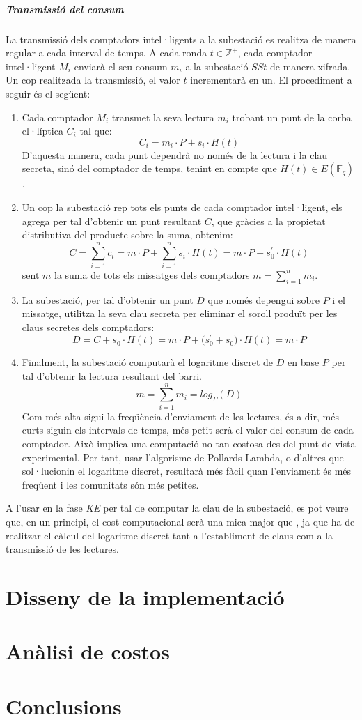 \documentclass{article}
\begin{document}
\subsubsection{Transmissió del consum}\label{section:ct}
La transmissió dels comptadors intel·ligents a la subestació es realitza de manera regular a cada interval de temps. A cada ronda $t \in \mathbb{Z^+}$, cada comptador intel·ligent $M_i$ enviarà el seu consum $m_i$ a la subestació $SSt$ de manera xifrada. Un cop realitzada la transmissió, el valor $t$ incrementarà en un. El procediment a seguir és el següent:
\begin{enumerate}
	\item Cada comptador $M_i$ transmet la seva lectura $m_i$ trobant un punt de la corba el·líptica $C_i$ tal que:
	\[C_i = m_i \cdot P + s_i \cdot H(t)\]
	D'aquesta manera, cada punt dependrà no només de la lectura i la clau secreta, sinó del comptador de temps, tenint en compte que $H(t) \in E(\mathbb{F}_q)$.
	\item Un cop la subestació rep tots els punts de cada comptador intel·ligent, els agrega per tal d'obtenir un punt resultant $C$, que gràcies a la propietat distributiva del producte sobre la suma, obtenim:
	\[C = \sum_{i=1}^{n}c_i = m \cdot P + \sum_{i=1}^{n}s_i \cdot H(t) = m \cdot P + s_0^{'}\cdot H(t)\]
	sent $m$ la suma de tots els missatges dels comptadors $m = \sum_{i=1}^{n} m_i$.
	\item La subestació, per tal d'obtenir un punt $D$ que només depengui sobre $P$ i el missatge, utilitza la seva clau secreta per eliminar el soroll produït per les claus secretes dels comptadors:
	\[D = C + s_0 \cdot H(t) = m \cdot P + \big( s_0^{'} + s_0 \big) \cdot H(t) = m \cdot P\]
	\item Finalment, la subestació computarà el logaritme discret de $D$ en base $P$ per tal d'obtenir la lectura resultant del barri.
	\[m = \sum_{i=1}^{n} m_i = log_P(D)\]
	Com més alta sigui la freqüència d'enviament de les lectures, és a dir, més curts siguin els intervals de temps, més petit serà el valor del consum de cada comptador. Això implica una computació no tan costosa des del punt de vista experimental. Per tant, usar l'algorisme de Pollards Lambda, o d'altres que sol·lucionin el logaritme discret, resultarà més fàcil quan l'enviament és més freqüent i les comunitats són més petites.
\end{enumerate}
A l'usar \cite{busom} en la fase \textit{KE} per tal de computar la clau de la subestació, es pot veure que, en un principi, el cost computacional serà una mica major que \cite{busom}, ja que \cite{recsi} ha de realitzar el càlcul del logaritme discret tant a l'establiment de claus com a la transmissió de les lectures.
\newpage\part{Disseny de la implementació}\label{part:disseny}

\newpage
\part{Anàlisi de costos}\label{part:analisis}

\newpage
\part{Conclusions}

\newpage


\end{document}
